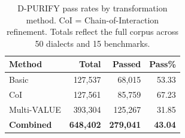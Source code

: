 \begin{table}[t]
\centering
\scriptsize
\begin{tabular}{lrrr}
\toprule
\textbf{Method} & \textbf{Total} & \textbf{Passed} & \textbf{Pass\%} \\
\midrule
\dllm{} Basic & 127,537 & 68,015 & 53.33 \\
\dllm{} CoI & 127,561 & 85,759 & 67.23 \\
Multi-VALUE & 393,304 & 125,267 & 31.85 \\
\midrule
\textbf{Combined} & \textbf{648,402} & \textbf{279,041} & \textbf{43.04} \\
\bottomrule
\end{tabular}
\caption{D-PURIFY pass rates by transformation method. CoI = Chain-of-Interaction refinement. Totals reflect the full corpus across 50 dialects and 15 benchmarks.}
\label{tab:quality_results}
\end{table}